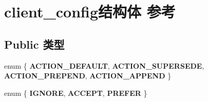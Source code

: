 \hypertarget{structclient__config}{}\section{client\+\_\+config结构体 参考}
\label{structclient__config}
\subsection*{Public 类型}
\begin{DoxyCompactItemize}
\item 
\mbox{\label{structclient__config_ae4da15160dfcead33dc542314bb13b58}} 
enum \{ {\bfseries A\+C\+T\+I\+O\+N\+\_\+\+D\+E\+F\+A\+U\+LT}, 
{\bfseries A\+C\+T\+I\+O\+N\+\_\+\+S\+U\+P\+E\+R\+S\+E\+DE}, 
{\bfseries A\+C\+T\+I\+O\+N\+\_\+\+P\+R\+E\+P\+E\+ND}, 
{\bfseries A\+C\+T\+I\+O\+N\+\_\+\+A\+P\+P\+E\+ND}
 \}
\item 
\mbox{\label{structclient__config_ab4929b32e551d5fef32286c9ebd7dd6d}} 
enum \{ {\bfseries I\+G\+N\+O\+RE}, 
{\bfseries A\+C\+C\+E\+PT}, 
{\bfseries P\+R\+E\+F\+ER}
 \}
\end{DoxyCompactItemize}
